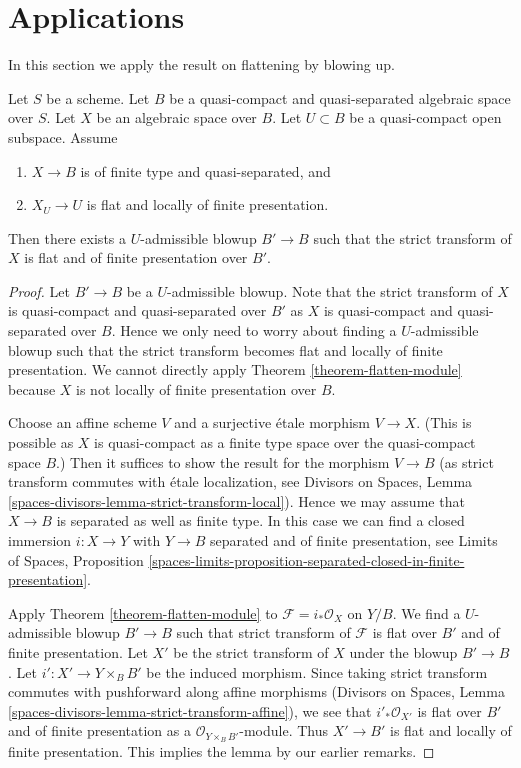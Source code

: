 \section{Applications}
\label{section-applications-flattening-by-blowing-up}

\noindent
In this section we apply the result on flattening by blowing up.

\begin{lemma}
\label{lemma-flat-after-blowing-up}
Let $S$ be a scheme.
Let $B$ be a quasi-compact and quasi-separated algebraic space over $S$.
Let $X$ be an algebraic space over $B$.
Let $U \subset B$ be a quasi-compact open subspace.
Assume
\begin{enumerate}
\item $X \to B$ is of finite type and quasi-separated, and
\item $X_U \to U$ is flat and locally of finite presentation.
\end{enumerate}
Then there exists a $U$-admissible blowup $B' \to B$ such that
the strict transform of $X$ is flat and of finite presentation
over $B'$.
\end{lemma}

\begin{proof}
Let $B' \to B$ be a $U$-admissible blowup. Note that the strict transform
of $X$ is quasi-compact and quasi-separated over $B'$ as $X$ is quasi-compact
and quasi-separated over $B$. Hence we only need to worry about finding
a $U$-admissible blowup such that the strict transform becomes flat and
locally of finite presentation. We cannot directly apply
Theorem \ref{theorem-flatten-module} because $X$ is not locally of finite
presentation over $B$.

\medskip\noindent
Choose an affine scheme $V$ and a surjective \'etale morphism $V \to X$.
(This is possible as $X$ is quasi-compact as a finite type space over
the quasi-compact space $B$.) Then it suffices to show the result for
the morphism $V \to B$ (as strict transform commutes with \'etale
localization, see Divisors on Spaces,
Lemma \ref{spaces-divisors-lemma-strict-transform-local}).
Hence we may assume that $X \to B$ is separated as well as finite type.
In this case we can find a closed immersion $i : X \to Y$ with $Y \to B$
separated and of finite presentation, see
Limits of Spaces, Proposition
\ref{spaces-limits-proposition-separated-closed-in-finite-presentation}.

\medskip\noindent
Apply Theorem \ref{theorem-flatten-module} to $\mathcal{F} = i_*\mathcal{O}_X$
on $Y/B$. We find a $U$-admissible blowup $B' \to B$ such that strict
transform of $\mathcal{F}$ is flat over $B'$ and of finite presentation.
Let $X'$ be the strict transform of $X$ under the blowup $B' \to B$.
Let $i' : X' \to Y \times_B B'$ be the induced morphism.
Since taking strict transform commutes with pushforward along affine
morphisms (Divisors on Spaces, Lemma
\ref{spaces-divisors-lemma-strict-transform-affine}),
we see that $i'_*\mathcal{O}_{X'}$ is flat over $B'$ and of
finite presentation as a $\mathcal{O}_{Y \times_B B'}$-module.
Thus $X' \to B'$ is flat and locally of finite presentation.
This implies the lemma by our earlier remarks.
\end{proof}

